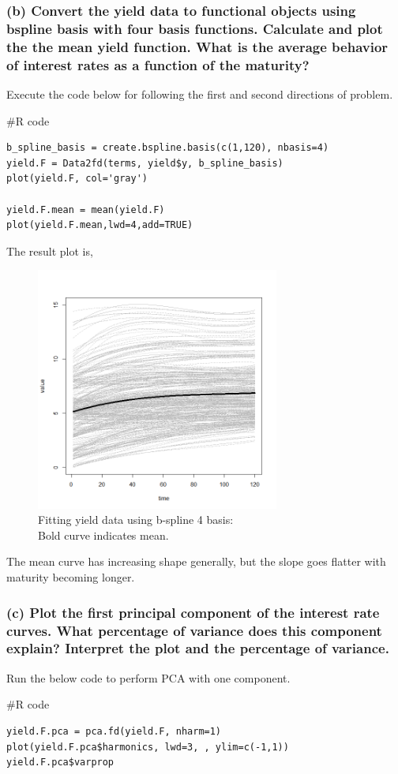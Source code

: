\documentclass{article}
\newenvironment{Rcode}%
{%
    \begin{mdframed}
    \#R code
    \begin{small}
}
{%
    \end{small}
    \end{mdframed}
}
\begin{document}
\newpage
\subsubsection*{(b) Convert the yield data to functional objects using bspline basis with four basis functions. 
Calculate and plot the the mean yield function. What is the average behavior of interest rates as a function of the maturity?}

Execute the code below for following the first and second directions of problem.
\begin{Rcode}
    \begin{verbatim}
b_spline_basis = create.bspline.basis(c(1,120), nbasis=4)
yield.F = Data2fd(terms, yield$y, b_spline_basis)
plot(yield.F, col='gray')

yield.F.mean = mean(yield.F)
plot(yield.F.mean,lwd=4,add=TRUE)
    \end{verbatim}
\end{Rcode}
The result plot is,\\
\begin{figure}[hh]
    \centering
    \includegraphics[height=8cm]{yield_bspline4fit}
    \caption{Fitting yield data using b-spline 4 basis:\\Bold curve indicates mean.}
\end{figure}

The mean curve has increasing shape generally, but the slope goes flatter with maturity becoming longer.

\newpage
\subsubsection*{(c) Plot the first principal component of the interest rate curves. What percentage of variance does this component explain? Interpret the plot and the percentage of variance.}
Run the below code to perform PCA with one component.
\begin{Rcode}
    \begin{verbatim}
yield.F.pca = pca.fd(yield.F, nharm=1)
plot(yield.F.pca$harmonics, lwd=3, , ylim=c(-1,1))
yield.F.pca$varprop
    \end{verbatim}
\end{Rcode}
\end{document}
